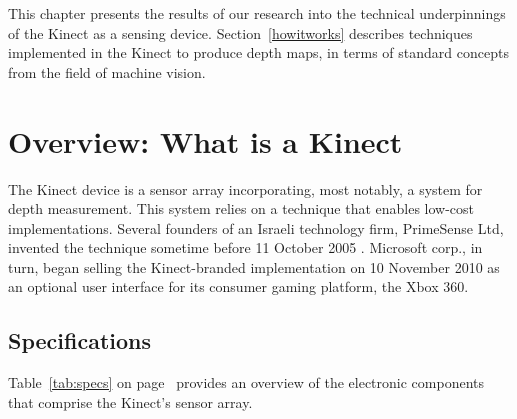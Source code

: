 This chapter presents the results of our research into the technical
underpinnings of the Kinect as a sensing device. Section~\ref{howitworks}
describes techniques implemented in the Kinect to produce depth maps, in terms
of standard concepts from the field of machine vision. %

\section{Overview: What is a Kinect}

The Kinect device is a sensor array incorporating, most notably, a system for
depth measurement. This system relies on a technique that enables low-cost
implementations. Several founders of an Israeli technology firm, PrimeSense Ltd,
invented the technique sometime before 11 October 2005 \cite{ZALEVSKY:2007}.
Microsoft corp., in turn, began selling the Kinect-branded implementation on 10
November 2010 as an optional user interface for its consumer gaming platform,
the Xbox 360.


\subsection{Specifications}

Table~\ref{tab:specs} on page~\pageref{tab:specs} provides an overview of the
electronic components that comprise the Kinect's sensor array.

